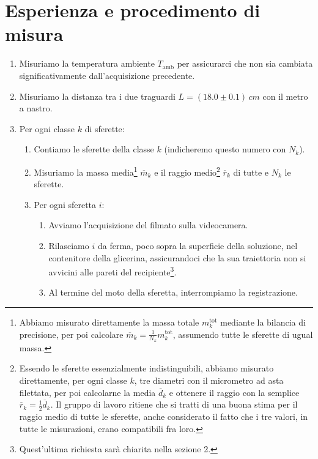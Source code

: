 \documentclass{article}
\begin{document}
\pagebreak
\section{Esperienza e procedimento di misura}

\begin{enumerate}
  \item Misuriamo la temperatura ambiente $T_\text{amb}$ per assicurarci
    che non sia cambiata significativamente dall'acquisizione precedente.
  \item Misuriamo la distanza tra i due traguardi $L = (18.0\pm0.1)\,\unit{cm}$
    con il metro a nastro.
  \item Per ogni classe $k$ di sferette:
  \begin{enumerate}
    \item
      Contiamo le sferette della classe $k$ (indicheremo questo numero
      con $N_k$).
    \item
      Misuriamo la massa media\footnote{
        Abbiamo misurato direttamente la massa totale $m_k^\text{tot}$
        mediante la bilancia di precisione, per poi calcolare
        $\overline{m}_k = \frac{1}{N_k} m_k^\text{tot}$,
        assumendo tutte le sferette di ugual massa.
      } $\overline{m}_k$ e il raggio medio\footnote{
        Essendo le sferette essenzialmente indistinguibili, abbiamo
        misurato direttamente, per ogni classe $k$, tre diametri con
        il micrometro ad asta filettata, per poi calcolarne la media
        $\overline{d}_k$ e ottenere il raggio con la semplice
        $\overline{r}_k = \frac{1}{2} \overline{d}_k$.
        Il gruppo di lavoro ritiene che si tratti di una buona stima
        per il raggio medio di tutte le sferette, anche considerato
        il fatto che i tre valori, in tutte le misurazioni, erano
        compatibili fra loro.
      } $\overline{r}_k$ di tutte e $N_k$ le sferette.
    \item Per ogni sferetta $i$:
    \begin{enumerate}
      \item
        Avviamo l'acquisizione del filmato sulla videocamera.
      \item
        Rilasciamo $i$ da ferma, poco sopra la superficie della soluzione,
        nel contenitore della glicerina, assicurandoci che la sua traiettoria
        non si avvicini alle pareti del recipiente\footnote{
          Quest'ultima richiesta sarà chiarita nella sezione 2.
        }.
      \item
        Al termine del moto della sferetta, interrompiamo la registrazione.
    \end{enumerate}
  \end{enumerate}
\end{enumerate}
\end{document}
